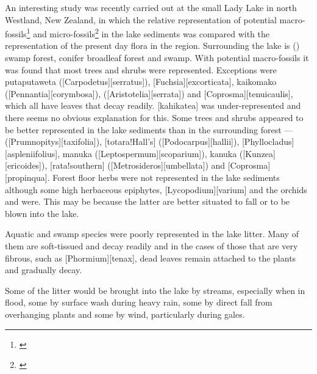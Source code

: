 An interesting study was recently carried out at the small Lady Lake in north Westland, New Zealand, in which the relative representation of potential macro-fossils\footnote{\cite{drake1980influx}} and micro-fossils\footnote{\cite{pocknall1980modern}} in the lake sediments was compared with the representation of the present day flora in the region.
Surrounding the lake is  () swamp forest, conifer broadleaf forest and swamp.
With potential macro-fossils it was found that most trees and shrubs were represented.
Exceptions were putaputaweta ([Carpodetus][serratus]),  [Fuchsia][excorticata], kaikomako ([Pennantia][corymbosa]),  ([Aristotelia][serrata]) and [Coprosma][tenuicaulis], which all have leaves that decay readily.
[kahikatea] was under-represented and there seems no obvious explanation for this.
Some trees and shrubs appeared to be better represented in the lake sediments than in the surrounding forest ---  ([Prumnopitys][taxifolia]), [totara!Hall's] ([Podocarpus][hallii]), [Phyllocladus][aspleniifolius], manuka ([Leptospermum][scoparium]), kanuka ([Kunzea][ericoides]), [rata!southern] ([Metrosideros][umbellata]) and [Coprosma][propinqua].
Forest floor herbs were not represented in the lake sediments although some high herbaceous epiphytes, [Lycopodium][varium] and the orchids  and  were.
This may be because the latter are better situated to fall or to be blown into the lake.

Aquatic and swamp species were poorly represented in the lake litter.
Many of them are soft-tissued and decay readily and in the cases of those that are very fibrous, such as [Phormium][tenax], dead leaves remain attached to the plants and gradually decay.

Some of the litter would be brought into the lake by streams, especially when in flood, some by surface wash during heavy rain, some by direct fall from overhanging plants and some by wind, particularly during gales.


